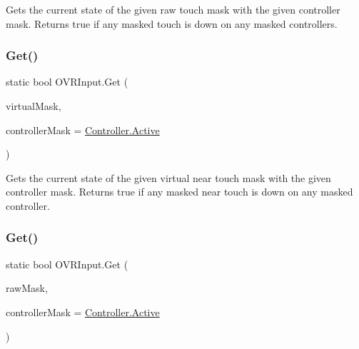 Gets the current state of the given raw touch mask with the given controller mask. Returns true if any masked touch is down on any masked controllers. 

\mbox{\label{class_o_v_r_input_a89c93aac3fe4c225f2dd8984055cc163}} 
\subsubsection{\texorpdfstring{Get()}{Get()}\hspace{0.1cm}{\footnotesize\ttfamily [5/10]}}
{\footnotesize\ttfamily static bool O\+V\+R\+Input.\+Get (\begin{DoxyParamCaption}\item[{\mbox{\hyperlink{class_o_v_r_input_afa31aa573064be9bab8fc9e58cddeab6}{Near\+Touch}}}]{virtual\+Mask,  }\item[{\mbox{\hyperlink{class_o_v_r_input_a5c86f9052a9cbb0b73779ff5704d60a8}{Controller}}}]{controller\+Mask = {\ttfamily \mbox{\hyperlink{class_o_v_r_input_a5c86f9052a9cbb0b73779ff5704d60a8a4d3d769b812b6faa6b76e1a8abaece2d}{Controller.\+Active}}} }\end{DoxyParamCaption})\hspace{0.3cm}{\ttfamily [static]}}



Gets the current state of the given virtual near touch mask with the given controller mask. Returns true if any masked near touch is down on any masked controller. 

\mbox{\label{class_o_v_r_input_afa96809b0dd349bfa586e97932f4f129}} 
\subsubsection{\texorpdfstring{Get()}{Get()}\hspace{0.1cm}{\footnotesize\ttfamily [6/10]}}
{\footnotesize\ttfamily static bool O\+V\+R\+Input.\+Get (\begin{DoxyParamCaption}\item[{\mbox{\hyperlink{class_o_v_r_input_ac9c3c10aa9911507c6dc66e2dd6ec60e}{Raw\+Near\+Touch}}}]{raw\+Mask,  }\item[{\mbox{\hyperlink{class_o_v_r_input_a5c86f9052a9cbb0b73779ff5704d60a8}{Controller}}}]{controller\+Mask = {\ttfamily \mbox{\hyperlink{class_o_v_r_input_a5c86f9052a9cbb0b73779ff5704d60a8a4d3d769b812b6faa6b76e1a8abaece2d}{Controller.\+Active}}} }\end{DoxyParamCaption})\hspace{0.3cm}{\ttfamily [static]}}



